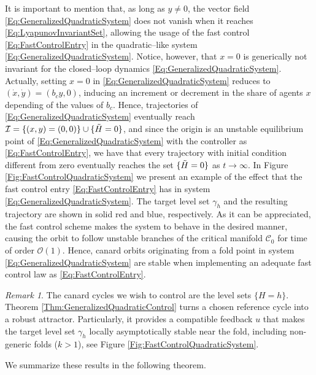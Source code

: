 \documentclass[3p]{elsarticle}
\theoremstyle{plain}
\theoremstyle{remark}
\newtheorem{remark}{Remark}
\theoremstyle{definition}
\begin{document}
        It is important to mention that, as long as $y\neq0$, the vector field \eqref{Eq:GeneralizedQuadraticSystem} does not vanish when it reaches \eqref{Eq:LyapunovInvariantSet}, allowing the usage of the fast control \eqref{Eq:FastControlEntry} in the quadratic--like system \eqref{Eq:GeneralizedQuadraticSystem}. Notice, however, that ${x=0}$ is generically not invariant for the closed--loop dynamics \eqref{Eq:GeneralizedQuadraticSystem}. Actually, setting $x=0$ in \eqref{Eq:GeneralizedQuadraticSystem} reduces to $\left( \dot{x}, \dot{y} \right) = \left( b_{c}y, 0 \right)$, inducing an increment or decrement in the share of agents $x$ depending of the values of $b_{c}$. Hence, trajectories of \eqref{Eq:GeneralizedQuadraticSystem} eventually reach $\mathcal{I} = \{ (x,y) = (0,0)\} \cup \{ \Tilde{H} = 0 \}$, and since the origin is an unstable equilibrium point of \eqref{Eq:GeneralizedQuadraticSystem} with the controller as \eqref{Eq:FastControlEntry}, we have that every trajectory with initial condition different from zero eventually reaches the set $\{ \Tilde{H} = 0\}$ as $t\xrightarrow{}\infty$. In Figure \ref{Fig:FastControlQuadraticSystem} we present an example of the effect that the fast control entry \eqref{Eq:FastControlEntry} has in system \eqref{Eq:GeneralizedQuadraticSystem}. The target level set $\gamma_{h}$ and the resulting trajectory are shown in solid red and blue, respectively. As it can be appreciated, the fast control scheme makes the system to behave in the desired manner, causing the orbit to follow unstable branches of the critical manifold $\mathcal{C}_{0}$ for time of order $\mathcal{O}(1)$. Hence, canard orbits originating from a fold point in system \eqref{Eq:GeneralizedQuadraticSystem} are stable when implementing an adequate fast control law as \eqref{Eq:FastControlEntry}. 
        
        \begin{remark}
            The canard cycles we wish to control are the level sets $\{H=h\}$. Theorem \ref{Thm:GeneralizedQuadraticControl} turns a chosen reference cycle into a robust attractor. Particularly, it
provides a compatible feedback $u$ that makes the target level
set $\gamma_h$ locally asymptotically stable near the fold, including non-generic folds
($k>1$), see Figure \ref{Fig:FastControlQuadraticSystem}. 
        \end{remark}
        
        
        We summarize these results in the following theorem.
\end{document}

